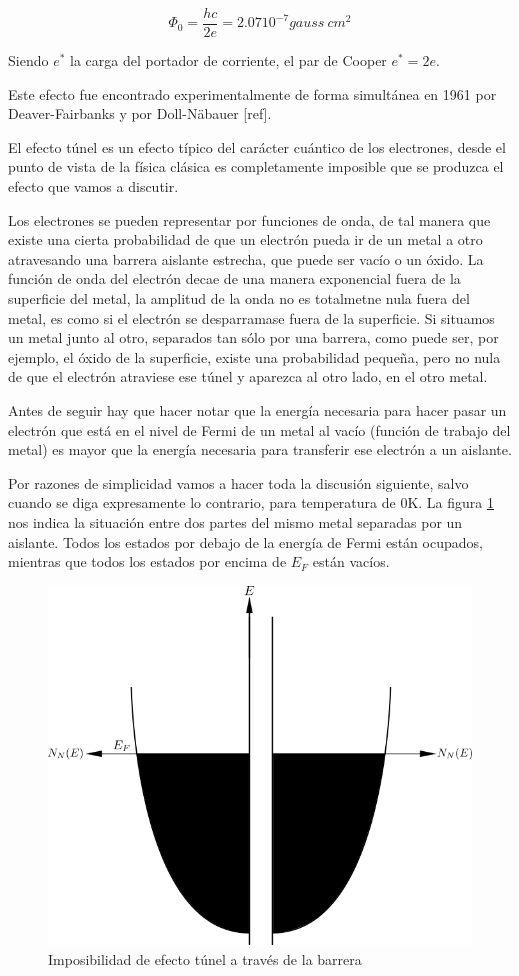\begin{equation}
    \Phi_0 = \frac{h c}{2 e} = 2.07 10^{-7} gauss\ cm^2
\end{equation}

Siendo $e^*$ la carga del portador de corriente, el par de Cooper $e^* = 2e$.

Este efecto fue encontrado experimentalmente de forma simultánea en 1961 por Deaver-Fairbanks \cite{deaver} y por Doll-Näbauer [ref].

El efecto túnel es un efecto típico del carácter cuántico de los electrones, desde el punto de vista de la física clásica es completamente imposible que se produzca el efecto que vamos a discutir.

Los electrones se pueden representar por funciones de onda, de tal manera que existe una cierta probabilidad de que un electrón pueda ir de un metal a otro atravesando una barrera aislante estrecha, que puede ser vacío o un óxido. La función de onda del electrón decae de una manera exponencial fuera de la superficie del metal, la amplitud de la onda no es totalmetne nula fuera del metal, es como si el electrón se desparramase fuera de la superficie. Si situamos un metal junto al otro, separados tan sólo por una barrera, como puede ser, por ejemplo, el óxido de la superficie, existe una probabilidad pequeña, pero no nula de que el electrón atraviese ese túnel y aparezca al otro lado, en el otro metal.

Antes de seguir hay que hacer notar que la energía necesaria para hacer pasar un electrón que está en el nivel de Fermi de un metal al vacío (función de trabajo del metal) es mayor que la energía necesaria para transferir ese electrón a un aislante.

Por razones de simplicidad vamos a hacer toda la discusión siguiente, salvo cuando se diga expresamente lo contrario, para temperatura de 0K. La figura \ref{fig:el1} nos indica la situación entre dos partes del mismo metal separadas por un aislante. Todos los estados por debajo de la energía de Fermi están ocupados, mientras que todos los estados por encima de $E_F$ están vacíos.

\begin{figure}[H]
\centering \includegraphics[width=0.8\linewidth]{img/el1.png}
\caption{Imposibilidad de efecto túnel a través de la barrera}
\label{fig:el1}
\end{figure}

